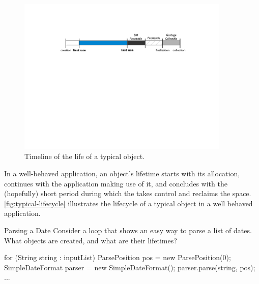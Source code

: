 

\begin{figure}
	\includegraphics[width=0.9\textwidth]{part2/Figures/lifetime/object-lifecycle}
	\caption{Timeline of the life of a typical object.}
	\label{fig:typical-lifecycle}
\end{figure}


In a well-behaved application, an object's lifetime starts with its allocation,
continues with the application making use of it, and concludes with the
(hopefully) short period during which the \jre takes control and reclaims the
space. \autoref{fig:typical-lifecycle} illustrates the lifecycle of a typical
object in a well behaved application.


\begin{example}{Parsing a Date}
Consider a loop that shows an easy way to parse
a list of dates. What objects are created, and what are their lifetimes?
\begin{center}
\begin{minipage}{0.74\textwidth}
\begin{framedlisting}
for (String string : inputList) {
  ParsePosition pos = new ParsePosition(0);
  SimpleDateFormat parser = new SimpleDateFormat();
  parser.parse(string, pos);
  ...
}
\end{framedlisting}
\end{minipage}
\end{center}
\end{example}

